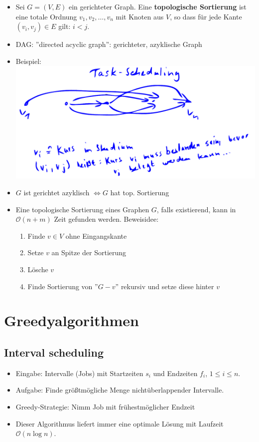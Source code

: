 \documentclass{scrartcl}
\begin{document}
\begin{itemize}
	\item Sei $ G = (V,E) $ ein gerichteter Graph. Eine \textbf{topologische Sortierung} ist eine totale Ordnung $ v_1,v_2,\ldots,v_n $ mit Knoten aus $ V $, so dass für jede Kante $ (v_i,v_j) \in E $ gilt: $ i < j $.
	\item DAG: ''directed acyclic graph'': gerichteter, azyklische Graph
	\item Beispiel: \\
	\includegraphics[width=\linewidth]{figures/task-scheduling.pdf}
	\item $ G $ ist gerichtet azyklisch $ \iff G $ hat top. Sortierung
	\item Eine topologische Sortierung eines Graphen $ G $, falls existierend, kann in $ \mathcal{O}(n+m) $ Zeit gefunden werden. Beweisidee:
	\begin{enumerate}
		\item Finde $ v \in V $ ohne Eingangskante
		\item Setze $ v $ an Spitze der Sortierung
		\item Lösche $ v $
		\item Finde Sortierung von ''$ G - v $'' rekursiv und setze diese hinter $ v $
	\end{enumerate}
\end{itemize}

\section{Greedyalgorithmen}

\subsection{Interval scheduling}

\begin{itemize}
	\item Eingabe: Intervalle (Jobs) mit Startzeiten $ s_i $ und Endzeiten $ f_i $, $ 1 \leq i \leq n $.
	\item Aufgabe: Finde größtmögliche Menge nichtüberlappender Intervalle.
	\item Greedy-Strategie: Nimm Job mit frühestmöglicher Endzeit
	\item Dieser Algorithmus liefert immer eine optimale Lösung mit Laufzeit $ \mathcal{O}(n \log n) $.
\end{itemize}
\end{document}
